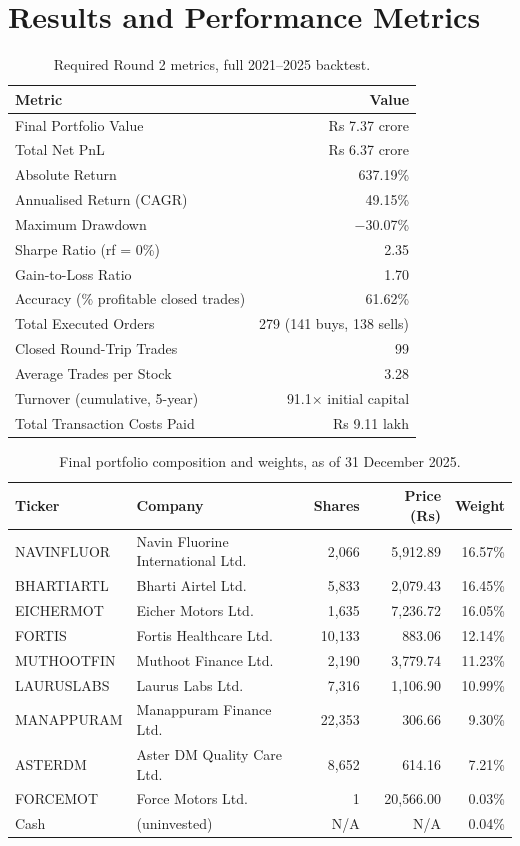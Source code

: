 \documentclass[11pt]{article}
\begin{document}
\section{Results and Performance Metrics}

\begin{table}[h]
\centering
\begin{tabular}{lr}
\toprule
\textbf{Metric} & \textbf{Value} \\
\midrule
Final Portfolio Value & Rs 7.37 crore \\
Total Net PnL & Rs 6.37 crore \\
Absolute Return & 637.19\% \\
Annualised Return (CAGR) & 49.15\% \\
Maximum Drawdown & $-$30.07\% \\
Sharpe Ratio (rf = 0\%) & 2.35 \\
Gain-to-Loss Ratio & 1.70 \\
Accuracy (\% profitable closed trades) & 61.62\% \\
Total Executed Orders & 279 (141 buys, 138 sells) \\
Closed Round-Trip Trades & 99 \\
Average Trades per Stock & 3.28 \\
Turnover (cumulative, 5-year) & 91.1$\times$ initial capital \\
Total Transaction Costs Paid & Rs 9.11 lakh \\
\bottomrule
\end{tabular}
\caption{Required Round 2 metrics, full 2021--2025 backtest.}
\end{table}

\begin{table}[h]
\centering
\begin{tabular}{llrrr}
\toprule
\textbf{Ticker} & \textbf{Company} & \textbf{Shares} & \textbf{Price (Rs)} & \textbf{Weight} \\
\midrule
NAVINFLUOR & Navin Fluorine International Ltd. & 2{,}066 & 5{,}912.89 & 16.57\% \\
BHARTIARTL & Bharti Airtel Ltd. & 5{,}833 & 2{,}079.43 & 16.45\% \\
EICHERMOT & Eicher Motors Ltd. & 1{,}635 & 7{,}236.72 & 16.05\% \\
FORTIS & Fortis Healthcare Ltd. & 10{,}133 & 883.06 & 12.14\% \\
MUTHOOTFIN & Muthoot Finance Ltd. & 2{,}190 & 3{,}779.74 & 11.23\% \\
LAURUSLABS & Laurus Labs Ltd. & 7{,}316 & 1{,}106.90 & 10.99\% \\
MANAPPURAM & Manappuram Finance Ltd. & 22{,}353 & 306.66 & 9.30\% \\
ASTERDM & Aster DM Quality Care Ltd. & 8{,}652 & 614.16 & 7.21\% \\
FORCEMOT & Force Motors Ltd. & 1 & 20{,}566.00 & 0.03\% \\
\quad Cash & (uninvested) & N/A & N/A & 0.04\% \\
\bottomrule
\end{tabular}
\caption{Final portfolio composition and weights, as of 31 December 2025.}
\end{table}
\end{document}
